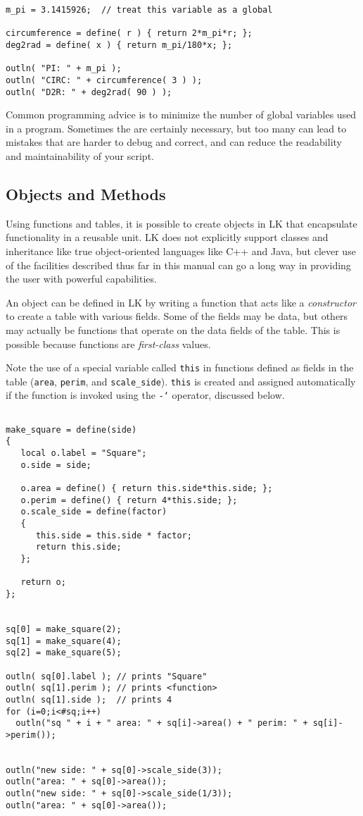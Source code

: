 \documentclass{article}
\newcommand\gt{\char`\>}
\begin{document}
\begin{verbatim}
m_pi = 3.1415926;  // treat this variable as a global

circumference = define( r ) { return 2*m_pi*r; };
deg2rad = define( x ) { return m_pi/180*x; };

outln( "PI: " + m_pi );
outln( "CIRC: " + circumference( 3 ) );
outln( "D2R: " + deg2rad( 90 ) );
\end{verbatim}

Common programming advice is to minimize the number of global variables used in a program.  Sometimes the are certainly necessary, but too many can lead to mistakes that are harder to debug and correct, and can reduce the readability and maintainability of your script.

\subsection{Objects and Methods}

Using functions and tables, it is possible to create objects in LK that encapsulate functionality in a reusable unit.  LK does not explicitly support classes and inheritance like true object-oriented languages like C++ and Java, but clever use of the facilities described thus far in this manual can go a long way in providing the user with powerful capabilities.

An object can be defined in LK by writing a function that acts like a \emph{constructor} to create a table with various fields.  Some of the fields may be data, but others may actually be functions that operate on the data fields of the table.  This is possible because functions are \emph{first-class} values.

Note the use of a special variable called \texttt{this} in functions defined as fields in the table (\texttt{area}, \texttt{perim}, and \texttt{scale\_side}).  \texttt{this} is created and assigned automatically if the function is invoked using the \texttt{-\gt} operator, discussed below.

\begin{verbatim}

make_square = define(side)
{
   local o.label = "Square";
   o.side = side;

   o.area = define() { return this.side*this.side; };  
   o.perim = define() { return 4*this.side; };
   o.scale_side = define(factor)
   {
      this.side = this.side * factor;
      return this.side;
   };
   
   return o;
};


sq[0] = make_square(2);
sq[1] = make_square(4);
sq[2] = make_square(5);

outln( sq[0].label ); // prints "Square"
outln( sq[1].perim ); // prints <function>
outln( sq[1].side );  // prints 4
for (i=0;i<#sq;i++)
  outln("sq " + i + " area: " + sq[i]->area() + " perim: " + sq[i]->perim());


outln("new side: " + sq[0]->scale_side(3));
outln("area: " + sq[0]->area());
outln("new side: " + sq[0]->scale_side(1/3));
outln("area: " + sq[0]->area());
\end{verbatim}
\end{document}
